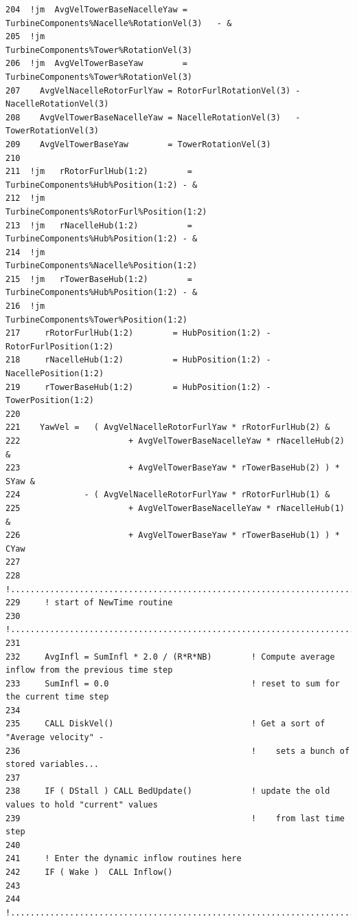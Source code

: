\documentclass[11pt]{article}
\begin{document}
{\begin{verbatim}
204  !jm  AvgVelTowerBaseNacelleYaw = TurbineComponents%Nacelle%RotationVel(3)   - &
205  !jm                                                TurbineComponents%Tower%RotationVel(3)
206  !jm  AvgVelTowerBaseYaw        = TurbineComponents%Tower%RotationVel(3)    
207    AvgVelNacelleRotorFurlYaw = RotorFurlRotationVel(3) - NacelleRotationVel(3)
208    AvgVelTowerBaseNacelleYaw = NacelleRotationVel(3)   - TowerRotationVel(3)
209    AvgVelTowerBaseYaw        = TowerRotationVel(3)    
210        
211  !jm   rRotorFurlHub(1:2)        = TurbineComponents%Hub%Position(1:2) - &
212  !jm                                                TurbineComponents%RotorFurl%Position(1:2)
213  !jm   rNacelleHub(1:2)          = TurbineComponents%Hub%Position(1:2) - &
214  !jm                                                TurbineComponents%Nacelle%Position(1:2)
215  !jm   rTowerBaseHub(1:2)        = TurbineComponents%Hub%Position(1:2) - &
216  !jm                                                TurbineComponents%Tower%Position(1:2)
217     rRotorFurlHub(1:2)        = HubPosition(1:2) - RotorFurlPosition(1:2)
218     rNacelleHub(1:2)          = HubPosition(1:2) - NacellePosition(1:2)
219     rTowerBaseHub(1:2)        = HubPosition(1:2) - TowerPosition(1:2)
220  
221    YawVel =   ( AvgVelNacelleRotorFurlYaw * rRotorFurlHub(2) &
222                      + AvgVelTowerBaseNacelleYaw * rNacelleHub(2) &
223                      + AvgVelTowerBaseYaw * rTowerBaseHub(2) ) * SYaw &
224             - ( AvgVelNacelleRotorFurlYaw * rRotorFurlHub(1) &
225                      + AvgVelTowerBaseNacelleYaw * rNacelleHub(1) &
226                      + AvgVelTowerBaseYaw * rTowerBaseHub(1) ) * CYaw
227    
228     !...........................................................................
229     ! start of NewTime routine
230     !...........................................................................
231  
232     AvgInfl = SumInfl * 2.0 / (R*R*NB)        ! Compute average inflow from the previous time step
233     SumInfl = 0.0                             ! reset to sum for the current time step
234  
235     CALL DiskVel()                            ! Get a sort of "Average velocity" - 
236                                               !    sets a bunch of stored variables...
237  
238     IF ( DStall ) CALL BedUpdate()            ! update the old values to hold "current" values 
239                                               !    from last time step
240  
241     ! Enter the dynamic inflow routines here
242     IF ( Wake )  CALL Inflow()
243  
244     !...........................................................................

\end{verbatim}}
\end{document}
